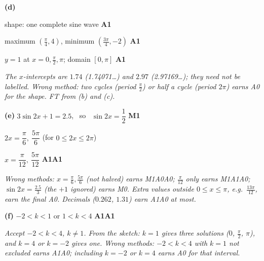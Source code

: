 \documentclass[12pt, twoside]{article}
\begin{document}
\begin{enumerate}[itemsep=0.1cm]
\textbf{(d)}

\begin{minipage}[c]{0.42\linewidth}
\centering
{}
\end{minipage}
\hfill
\begin{minipage}[c]{0.54\linewidth}
shape: one complete sine wave \hfill \textbf{A1}

\smallskip
maximum $\left(\tfrac{\pi}{4}, 4\right)$, minimum
$\left(\tfrac{3\pi}{4}, -2\right)$ \hfill \textbf{A1}

\smallskip
$y = 1$ at $x = 0, \tfrac{\pi}{2}, \pi$; domain $[0, \pi]$ \hfill \textbf{A1}
\end{minipage}

\emph{The $x$-intercepts are $1.74$ (1.74071\ldots) and $2.97$
(2.97169\ldots); they need not be labelled. Wrong method: two cycles
(period $\frac{\pi}{2}$) or half a cycle (period $2\pi$) earns A0 for the
shape. FT from (b) and (c).}

\textbf{(e)} $3\sin 2x + 1 = 2.5$, \ so \ $\sin 2x = \dfrac{1}{2}$ \hfill \textbf{M1}

$2x = \dfrac{\pi}{6},\ \dfrac{5\pi}{6}$ \quad (for $0 \le 2x \le 2\pi$)

$x = \dfrac{\pi}{12},\ \dfrac{5\pi}{12}$ \hfill \textbf{A1A1}

\emph{Wrong methods: $x = \frac{\pi}{6}, \frac{5\pi}{6}$ (not halved)
earns M1A0A0; $\frac{\pi}{12}$ only earns M1A1A0; $\sin 2x = \frac{2.5}{3}$
(the $+1$ ignored) earns M0. Extra values outside $0 \le x \le \pi$, e.g.\
$\frac{13\pi}{12}$, earn the final A0. Decimals ($0.262$, $1.31$) earn A1A0
at most.}

\textbf{(f)} $-2 < k < 1$ \quad or \quad $1 < k < 4$ \hfill \textbf{A1A1}

\emph{Accept $-2 < k < 4$, $k \neq 1$. From the sketch: $k = 1$ gives three
solutions ($0$, $\frac{\pi}{2}$, $\pi$), and $k = 4$ or $k = -2$ gives one.
Wrong methods: $-2 < k < 4$ with $k = 1$ not excluded earns A1A0;
including $k = -2$ or $k = 4$ earns A0 for that interval.}

\end{enumerate}
\end{document}
